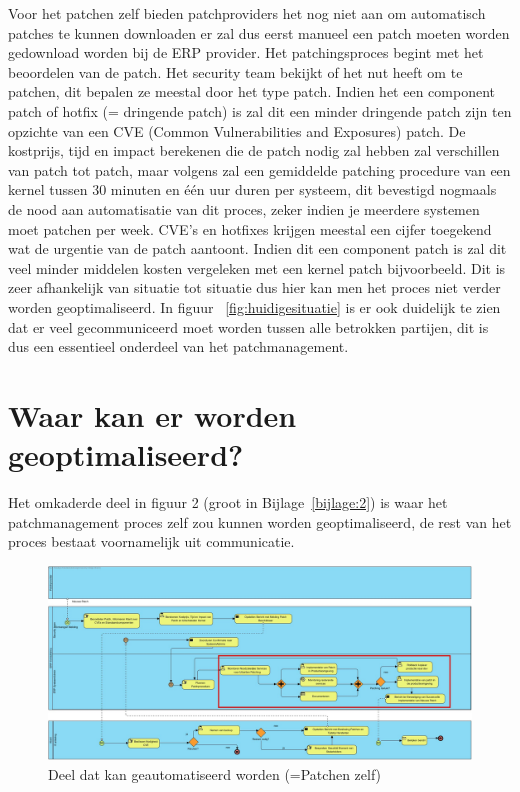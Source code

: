 Voor het patchen zelf bieden patchproviders het nog niet aan om automatisch patches te kunnen downloaden er zal dus eerst manueel een patch moeten worden gedownload worden bij de ERP provider. Het patchingsproces begint met het beoordelen van de patch. Het security team bekijkt of het nut heeft
om te patchen, dit bepalen ze meestal door het type patch. Indien het een component patch of hotfix (= dringende patch) is zal dit een minder dringende patch zijn ten opzichte van een CVE (Common Vulnerabilities and Exposures) patch. De kostprijs, tijd en impact berekenen
die de patch nodig zal hebben zal verschillen van patch tot patch, maar volgens \textcite{Heyndrickx2024} zal een gemiddelde patching procedure van een kernel tussen 30 minuten en één uur duren per systeem, dit bevestigd nogmaals de nood aan
automatisatie van dit proces, zeker indien je meerdere systemen moet patchen per week. CVE's en hotfixes krijgen meestal een cijfer toegekend wat de urgentie van de patch aantoont. Indien dit een component patch is zal dit veel minder middelen kosten vergeleken
met een kernel patch bijvoorbeeld. Dit is zeer afhankelijk van situatie tot situatie dus hier kan men het proces niet verder worden geoptimaliseerd. In figuur ~\ref{fig:huidigesituatie} is er ook duidelijk te zien dat er veel gecommuniceerd moet worden tussen alle betrokken partijen, dit is dus een essentieel onderdeel van het patchmanagement. \\


\section{Waar kan er worden geoptimaliseerd?}

Het omkaderde deel in figuur 2 (groot in Bijlage~\ref{bijlage:2}) is waar het patchmanagement proces zelf zou kunnen worden geoptimaliseerd, de rest van het proces bestaat voornamelijk uit communicatie.
 \begin{figure}[h]
    \centering
    \includegraphics[width=\textwidth]{huidigesituatie2.jpg}
    \caption{Deel dat kan geautomatiseerd worden (=Patchen zelf)}
     \label{fig:huidigesituatie2}
\end{figure}
\newpage


